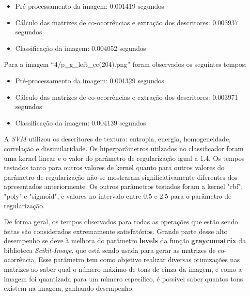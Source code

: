 \begin{itemize}
    \item Pré-processamento da imagem: 0.001419 segundos
    \item Cálculo das matrizes de co-ocorrências e extração dos descritores: 0.003937 segundos
    \item Classificação da imagem: 0.004052 segundos
\end{itemize}


\noindent
Para a imagem “4/p\_g\_left\_cc(204).png” foram observados os seguintes tempos:

\begin{itemize}
    \item Pré-processamento da imagem: 0.001329 segundos
    \item Cálculo das matrizes de co-ocorrências e extração dos descritores: 0.003971 segundos
    \item Classificação da imagem: 0.004139 segundos
\end{itemize}

A \emph{SVM} utilizou os descritores de textura: entropia, energia, homogeneidade, correlação e dissimilaridade. Os hiperparâmetros
utilzados no classificador foram uma kernel linear e o valor do parâmetro de regularização igual a 1.4. Os tempos testados tanto para outros
valores de kernel quanto para outros valores do parâmetro de regularização não se mostraram significativamente diferentes dos apresentados
anteriormente. Os outros parâmetros testados foram a kernel "rbf", "poly" e "sigmoid", e valores no intervalo entre 0.5 e 2.5 para 
o parâmetro de regularização.

De forma geral, os tempos observados para todas as operações que estão sendo feitas são 
considerados extremamente satisfatórios. Grande parte desse alto desempenho se deve à 
melhora do parâmetro \textbf{levels} da função \textbf{graycomatrix} da biblioteca \emph{Scikit-Image}, 
que está sendo usada para gerar as matrizes de co-ocorrência. Esse parâmetro tem como 
objetivo realizar diversas otimizações nas matrizes ao saber qual o número máximo de 
tons de cinza da imagem, e como a imagem foi quantizada para um número específico, é 
possível saber quantos tons existem na imagem, ganhando desempenho.
